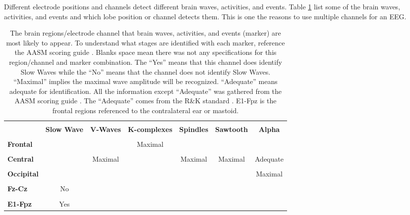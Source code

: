 \documentclass[12pt, oneside]{book}
\begin{document}
Different electrode positions and channels detect different brain waves, activities, and events. Table \ref{tab:wavetolobe} list some of the brain waves, activities, and events and which lobe position or channel detects them. This is one the reasons to use multiple channels for an EEG. 

\begin{table}[H]
	{\hspace{0cm}
		\begin{tabular}{|p{2cm}|c|c|c|c|c|c|}
			\hline \\ [-1.5ex]
			& \textbf{Slow Wave} & \textbf{V-Waves} & \textbf{K-complexes} & \textbf{Spindles} & \textbf{Sawtooth} & \textbf{Alpha} \\
			\hline \\ [-1.5ex]
				\textbf{Frontal} &  &  & Maximal &  &  &  \\
			\hline \\ [-1.5ex]
			\textbf{Central} &  & Maximal &  & Maximal & Maximal & Adequate \\
			\hline \\ [-1.5ex]
			\textbf{Occipital} &  &  &  &  &  & Maximal  \\
			\hline \\ [-1.5ex]
			\textbf{Fz-Cz} & No &  &  &  &  &\\
			\hline \\ [-1.5ex]
			\textbf{E1-Fpz} & Yes &  & & &  & \\
			\hline
		\end{tabular}
	} 
	\caption[The brain regions/electrode channel that brain waves, activities, and events (marker) are most likely to appear.]{The brain regions/electrode channel that brain waves, activities, and events (marker) are most likely to appear. To understand what stages are identified with each marker, reference the AASM scoring guide \cite{berry_md_chair_aasm_nodate}. Blanks space mean there was not any specifications for this region/channel and marker combination. The “Yes” means that this channel does identify Slow Waves while the “No” means that the channel does not identify Slow Waves. “Maximal” implies the maximal wave amplitude will be recognized. “Adequate” means adequate for identification. All the information except “Adequate” was gathered from the AASM scoring guide \cite{berry_md_chair_aasm_nodate}. The “Adequate” comes from the R\&K standard \cite{rechtschaffen_manual_nodate}. E1-Fpz is the frontal regions referenced to the contralateral ear or mastoid.}
	\label{tab:wavetolobe}
\end{table}
\end{document}
